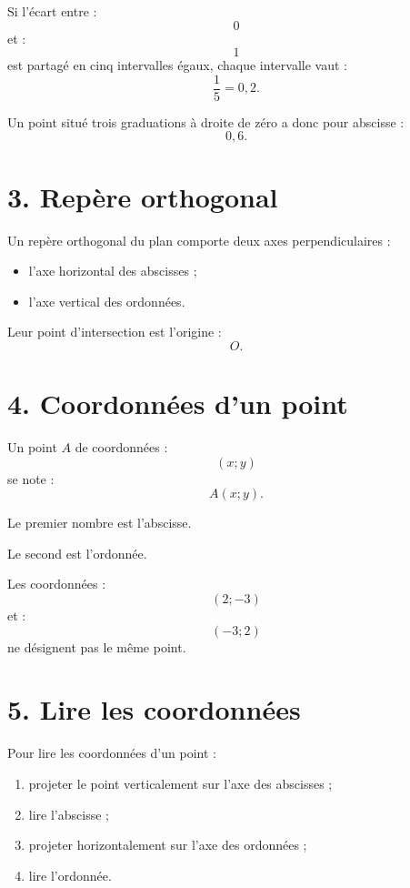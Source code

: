 Si l'écart entre :
\[
0
\]
et :
\[
1
\]
est partagé en cinq intervalles égaux, chaque intervalle vaut :
\[
\dfrac15=0{,}2.
\]

Un point situé trois graduations à droite de zéro a donc pour abscisse :
\[
0{,}6.
\]

\section{3. Repère orthogonal}

Un repère orthogonal du plan comporte deux axes perpendiculaires :
\begin{itemize}
\item l'axe horizontal des abscisses ;
\item l'axe vertical des ordonnées.
\end{itemize}

Leur point d'intersection est l'origine :
\[
O.
\]


\section{4. Coordonnées d'un point}

Un point $A$ de coordonnées :
\[
(x;y)
\]
se note :
\[
A(x;y).
\]

Le premier nombre est l'abscisse.

Le second est l'ordonnée.

\begin{attention}
Les coordonnées :
\[
(2;-3)
\]
et :
\[
(-3;2)
\]
ne désignent pas le même point.
\end{attention}

\section{5. Lire les coordonnées}

Pour lire les coordonnées d'un point :
\begin{enumerate}
\item projeter le point verticalement sur l'axe des abscisses ;
\item lire l'abscisse ;
\item projeter horizontalement sur l'axe des ordonnées ;
\item lire l'ordonnée.
\end{enumerate}

